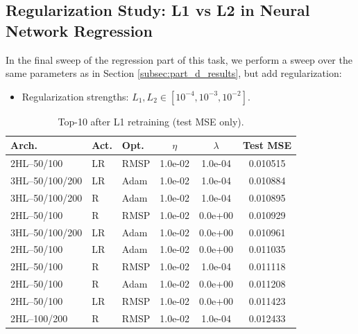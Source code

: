 \documentclass[amssymb,twocolumn,aps,floatfix]{revtex4-2}
\begin{document}
\subsection{Regularization Study: L1 vs L2 in Neural Network Regression}
\label{subsec:parte_results}

In the final sweep of the regression part of this task, we perform a sweep over the same parameters as in Section \ref{subsec:part_d_results}, but add regularization: 

\begin{itemize}
    \item Regularization strengths: $L_1, L_2 \in [10^{-4}, 10^{-3}, 10^{-2}]$. 
\end{itemize}


\begin{table}[h!]
\caption{Top-10 after L1 retraining (test MSE only).}
\label{tab:retrain-l1}
\scriptsize
\setlength{\tabcolsep}{2pt}\renewcommand{\arraystretch}{0.9}
\centering
\begin{tabular}{l l l S[table-format=1.1e-2] S[table-format=1.1e-3] S}
\toprule
Arch. & Act. & Opt. & {$\eta$} & {$\lambda$} & {Test MSE} \\
\midrule
2HL–50/100      & LR   & RMSP  & 1.0e-02 & 1.0e-04 & 0.010515 \\
3HL–50/100/200  & LR   & Adam  & 1.0e-02 & 1.0e-04 & 0.010884 \\
3HL–50/100/200  & R    & Adam  & 1.0e-02 & 1.0e-04 & 0.010895 \\
2HL–50/100      & R    & RMSP  & 1.0e-02 & 0.0e+00 & 0.010929 \\
3HL–50/100/200  & LR   & Adam  & 1.0e-02 & 0.0e+00 & 0.010961 \\
2HL–50/100      & LR   & Adam  & 1.0e-02 & 0.0e+00 & 0.011035 \\
2HL–50/100      & R    & RMSP  & 1.0e-02 & 1.0e-04 & 0.011118 \\
2HL–50/100      & R    & Adam  & 1.0e-02 & 0.0e+00 & 0.011208 \\
2HL–50/100      & LR   & RMSP  & 1.0e-02 & 0.0e+00 & 0.011423 \\
2HL–100/200     & R    & RMSP  & 1.0e-02 & 1.0e-04 & 0.012433 \\
\bottomrule
\end{tabular}
\end{table}
\end{document}
